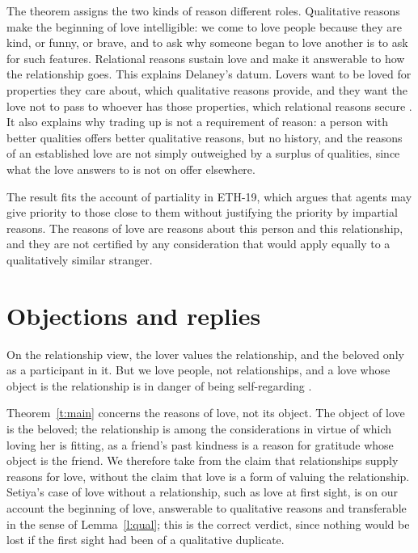 \documentclass{situationist-preprint}
\begin{document}
The theorem assigns the two kinds of reason different roles. Qualitative reasons make the beginning of love intelligible: we come to love people because they are kind, or funny, or brave, and to ask why someone began to love another is to ask for such features. Relational reasons sustain love and make it answerable to how the relationship goes. This explains Delaney's datum. Lovers want to be loved for properties they care about, which qualitative reasons provide, and they want the love not to pass to whoever has those properties, which relational reasons secure \citep{Delaney1996}. It also explains why trading up is not a requirement of reason: a person with better qualities offers better qualitative reasons, but no history, and the reasons of an established love are not simply outweighed by a surplus of qualities, since what the love answers to is not on offer elsewhere.

The result fits the account of partiality in ETH-19, which argues that agents may give priority to those close to them without justifying the priority by impartial reasons. The reasons of love are reasons about this person and this relationship, and they are not certified by any consideration that would apply equally to a qualitatively similar stranger.

\section{Objections and replies}

\begin{objection}\label{o:obj}
On the relationship view, the lover values the relationship, and the beloved only as a participant in it. But we love people, not relationships, and a love whose object is the relationship is in danger of being self-regarding \citep{Setiya2014}.
\end{objection}

\begin{reply}
Theorem~\ref{t:main} concerns the reasons of love, not its object. The object of love is the beloved; the relationship is among the considerations in virtue of which loving her is fitting, as a friend's past kindness is a reason for gratitude whose object is the friend. We therefore take from \citet{Kolodny2003} the claim that relationships supply reasons for love, without the claim that love is a form of valuing the relationship. Setiya's case of love without a relationship, such as love at first sight, is on our account the beginning of love, answerable to qualitative reasons and transferable in the sense of Lemma~\ref{l:qual}; this is the correct verdict, since nothing would be lost if the first sight had been of a qualitative duplicate.
\end{reply}
\end{document}
